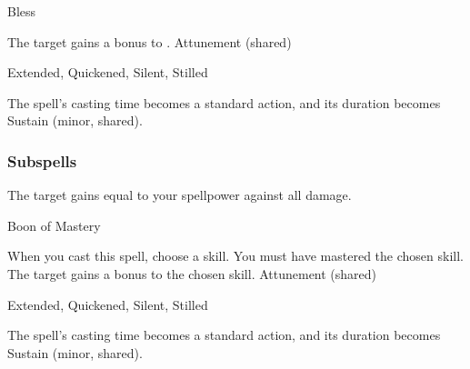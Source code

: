 \begin{spellsection}{Bless}
\begin{spellheader}
\end{spellheader}
\begin{spellcontent}
\begin{spelltargetinginfo}
\end{spelltargetinginfo}
\begin{spelleffects}
\spelleffect The target gains a  bonus to .
\spelldur Attunement (shared)
\end{spelleffects}
\end{spellcontent}
\begin{spellfooter}
 Extended, Quickened, Silent, Stilled
\end{spellfooter}
\begin{spellsubcontent}
\begin{spellcantrip}
The spell's casting time becomes a standard action, and its duration becomes Sustain (minor, shared).
\end{spellcantrip}
\end{spellsubcontent}
\end{spellsection}
\subsubsection{Subspells}
The target gains  equal to your spellpower against all damage.
\begin{spellsection}{Boon of Mastery}
\begin{spellheader}
\end{spellheader}
\begin{spellcontent}
\begin{spelltargetinginfo}
\end{spelltargetinginfo}
\begin{spelleffects}
\spellspecial
When you cast this spell, choose a skill.
You must have mastered the chosen skill.
\spelleffect
The target gains a  bonus to the chosen skill.
\spelldur Attunement (shared)
\end{spelleffects}
\end{spellcontent}
\begin{spellfooter}
 Extended, Quickened, Silent, Stilled
\end{spellfooter}
\begin{spellsubcontent}
\begin{spellcantrip}
The spell's casting time becomes a standard action, and its duration becomes Sustain (minor, shared).
\end{spellcantrip}
\end{spellsubcontent}
\end{spellsection}
